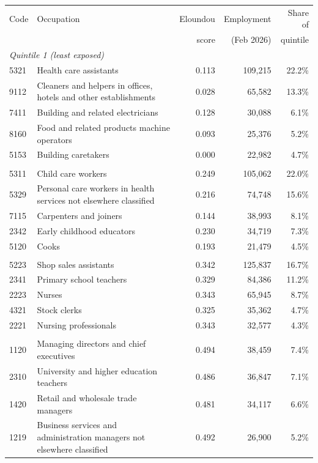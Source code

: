 \begin{tabular}{l p{6.2cm} r r r}
\toprule
Code & Occupation & Eloundou & Employment & Share of \\
 & & score & (Feb 2026) & quintile \\
\midrule
\multicolumn{5}{l}{\textit{Quintile 1 (least exposed)}} \\
5321 & Health care assistants & 0.113 & 109,215 & 22.2\% \\
9112 & Cleaners and helpers in offices, hotels and other establishments & 0.028 & 65,582 & 13.3\% \\
7411 & Building and related electricians & 0.128 & 30,088 & 6.1\% \\
8160 & Food and related products machine operators & 0.093 & 25,376 & 5.2\% \\
5153 & Building caretakers & 0.000 & 22,982 & 4.7\% \\
\addlinespace
\multicolumn{5}{l}{\textit{Quintile 2}} \\
5311 & Child care workers & 0.249 & 105,062 & 22.0\% \\
5329 & Personal care workers in health services not elsewhere classified & 0.216 & 74,748 & 15.6\% \\
7115 & Carpenters and joiners & 0.144 & 38,993 & 8.1\% \\
2342 & Early childhood educators & 0.230 & 34,719 & 7.3\% \\
5120 & Cooks & 0.193 & 21,479 & 4.5\% \\
\addlinespace
\multicolumn{5}{l}{\textit{Quintile 3}} \\
5223 & Shop sales assistants & 0.342 & 125,837 & 16.7\% \\
2341 & Primary school teachers & 0.329 & 84,386 & 11.2\% \\
2223 & Nurses & 0.343 & 65,945 & 8.7\% \\
4321 & Stock clerks & 0.325 & 35,362 & 4.7\% \\
2221 & Nursing professionals & 0.343 & 32,577 & 4.3\% \\
\addlinespace
\multicolumn{5}{l}{\textit{Quintile 4}} \\
1120 & Managing directors and chief executives & 0.494 & 38,459 & 7.4\% \\
2310 & University and higher education teachers & 0.486 & 36,847 & 7.1\% \\
1420 & Retail and wholesale trade managers & 0.481 & 34,117 & 6.6\% \\
1219 & Business services and administration managers not elsewhere classified & 0.492 & 26,900 & 5.2\% \\

\end{tabular}
